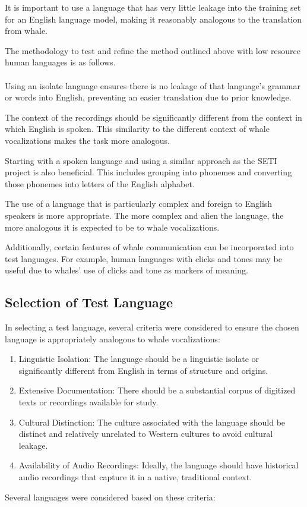 \documentclass{article}
\begin{document}
It is important to use a language that has very little leakage into the training set for an English language model, making it reasonably analogous to the translation from whale.

The methodology to test and refine the method outlined above with low resource human languages is as follows.\\ \\
Using an isolate language ensures there is no leakage of that language's grammar or words into English, preventing an easier translation due to prior knowledge.

The context of the recordings should be significantly different from the context in which English is spoken. This similarity to the different context of whale vocalizations makes the task more analogous.

Starting with a spoken language and using a similar approach as the SETI project is also beneficial. This includes grouping into phonemes and converting those phonemes into letters of the English alphabet.

The use of a language that is particularly complex and foreign to English speakers is more appropriate. The more complex and alien the language, the more analogous it is expected to be to whale vocalizations.

Additionally, certain features of whale communication can be incorporated into test languages. For example, human languages with clicks and tones may be useful due to whales' use of clicks and tone as markers of meaning.

\subsection{Selection of Test Language}
In selecting a test language, several criteria were considered to ensure the chosen language is appropriately analogous to whale vocalizations:
\begin{enumerate}
    \item Linguistic Isolation: The language should be a linguistic isolate or significantly different from English in terms of structure and origins.
    \item Extensive Documentation: There should be a substantial corpus of digitized texts or recordings available for study.
    \item Cultural Distinction: The culture associated with the language should be distinct and relatively unrelated to Western cultures to avoid cultural leakage.
    \item Availability of Audio Recordings: Ideally, the language should have historical audio recordings that capture it in a native, traditional context.
\end{enumerate}
Several languages were considered based on these criteria:
\end{document}
